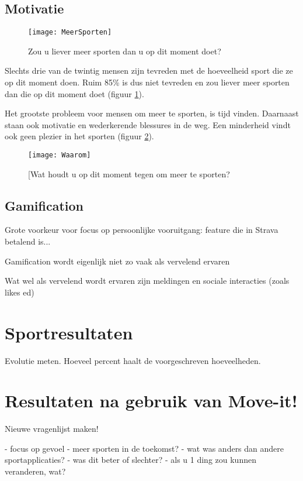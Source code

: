 \subsection{Motivatie}

\begin{figure}[h]
    \caption[Zou u liever meer sporten dan u op dit moment doet?]{Zou u liever meer sporten dan u op dit moment doet?}
    \texttt{[image: MeerSporten]}
    \label{fig:meerBewegen}
\end{figure}

Slechts drie van de twintig mensen zijn tevreden met de hoeveelheid sport die ze op dit moment doen. Ruim 85\% is dus niet tevreden en zou liever meer sporten dan die op dit moment doet (figuur \ref{fig:meerBewegen}).

Het grootste probleem voor mensen om meer te sporten, is tijd vinden. Daarnaast staan ook motivatie en wederkerende blessures in de weg. Een minderheid vindt ook geen plezier in het sporten (figuur \ref{fig:waarom}).

\begin{figure}[h]
    \caption[Wat houdt u op dit moment tegen om meer te sporten?]{[Wat houdt u op dit moment tegen om meer te sporten?}
    \texttt{[image: Waarom]}
    \label{fig:waarom}
\end{figure}

\subsection{Gamification}

Grote voorkeur voor focus op persoonlijke vooruitgang: feature die in Strava betalend is...

Gamification wordt eigenlijk niet zo vaak als vervelend ervaren

Wat wel als vervelend wordt ervaren zijn meldingen en sociale interacties (zoals likes ed)

\section{Sportresultaten}

Evolutie meten. Hoeveel percent haalt de voorgeschreven hoeveelheden.

\section{Resultaten na gebruik van Move-it!}

Nieuwe vragenlijst maken!

- focus op gevoel
- meer sporten in de toekomst?
- wat was anders dan andere sportapplicaties?
    - was dit beter of slechter?
- als u 1 ding zou kunnen veranderen, wat?